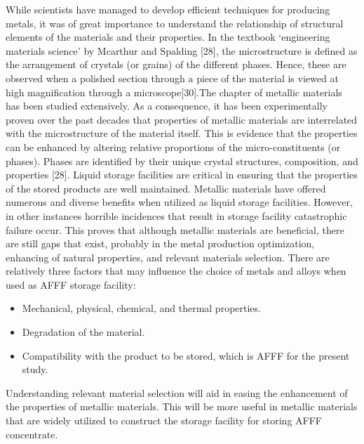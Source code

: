\documentclass[12pt]{report}
\begin{document}
While scientists have managed to develop efficient techniques for producing metals, it was of great importance to understand the relationship of structural elements of the materials and their properties. In the textbook ‘engineering materials science’ by Mcarthur and Spalding [28], the microstructure is defined as the arrangement of crystals (or grains) of the different phases. Hence, these are observed when a polished section through a piece of the material is viewed at high magnification through a microscope[30].The chapter of metallic materials has been studied extensively. As a consequence, it has been experimentally proven over the past decades that properties of metallic materials are interrelated with the microstructure of the material itself. This is evidence that the properties can be enhanced by altering relative proportions of the micro-constituents (or phases). Phases are identified by their unique crystal structures, composition, and properties [28].
Liquid storage facilities are critical in ensuring that the properties of the stored products are well maintained. Metallic materials have offered numerous and diverse benefits when utilized as liquid storage facilities. However, in other instances horrible incidences that result in storage facility catastrophic failure occur. This proves that although metallic materials are beneficial, there are still gaps that exist, probably in the metal production optimization, enhancing of natural properties, and relevant materials selection. There are relatively three factors that may influence the choice of metals and alloys when used as AFFF storage facility:

\begin{itemize}
    \item Mechanical, physical, chemical, and thermal properties.
    \item Degradation of the material.
    \item Compatibility with the product to be stored, which is AFFF for the present study.
\end{itemize}

Understanding relevant material selection will aid in easing the enhancement of the properties of metallic materials. This will be more useful in metallic materials that are widely utilized to construct the storage facility for storing AFFF concentrate. 
\end{document}

